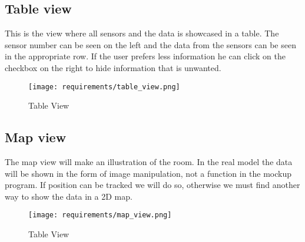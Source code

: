 \documentclass[../document]{subfiles}
\begin{document}
\subsection{Table view}
This is the view where all sensors and the data is showcased in a table. The sensor number can be seen on the left and the data from the sensors can be seen in the appropriate row. If the user prefers less information he can click on the checkbox on the right to hide information that is unwanted.

\begin{figure}[H]
\centering
\texttt{[image: requirements/table\_view.png]}
\caption{Table View}
\end{figure}

\subsection{Map view}
The map view will make an illustration of the room. In the real model the data will be shown in the form of image manipulation, not a function in the mockup program. If position can be tracked we will do so, otherwise we must find another way to show the data in a 2D map.

\begin{figure}[H]
\centering
\texttt{[image: requirements/map\_view.png]}
\caption{Table View}
\end{figure}
\end{document}
